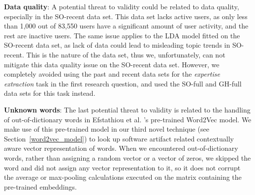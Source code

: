         \textbf{Data quality}: A potential threat to validity could be related to data quality, especially in the SO-recent data set. This data set lacks active users, as only less than 1,000 out of 83,550 users have a significant amount of user activity, and the rest are inactive users. The same issue applies to the LDA model fitted on the SO-recent data set, as lack of data could lead to misleading topic trends in SO-recent. This is the nature of the data set, thus we, unfortunately, can not mitigate this data quality issue on the SO-recent data set. However, we completely avoided using the past and recent data sets for the \emph{expertise extraction} task in the first research question, and used the SO-full and GH-full data sets for this task instead.
        
        \textbf{Unknown words}: The last potential threat to validity is related to the handling of out-of-dictionary words in Efstathiou et al. \cite{efstathiou2018word}'s pre-trained Word2Vec model. We make use of this pre-trained model in our third novel technique (see Section~\ref{word2vec_model}) to look up software artifact related contextually aware vector representation of words. When we encountered out-of-dictionary words, rather than assigning a random vector or a vector of zeros, we skipped the word and did not assign any vector representation to it, so it does not corrupt the average or max-pooling calculations executed on the matrix containing the pre-trained embeddings. 
        
        
